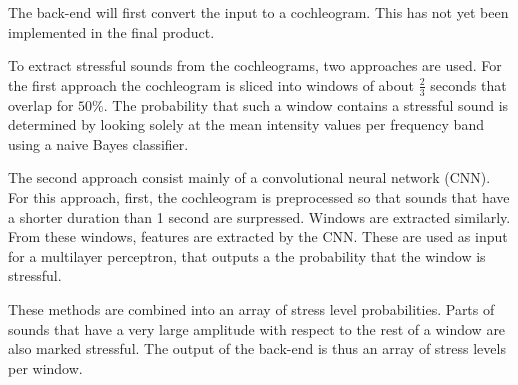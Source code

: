 The back-end will first convert the input to a cochleogram. This has not yet been implemented in the final product.

To extract stressful sounds from the cochleograms, two approaches are used. For the first approach the cochleogram is sliced into windows of about $\frac{2}{3}$ seconds that overlap for $50\%$. The probability that such a window contains a stressful sound is determined by looking solely at the mean intensity values per frequency band using a naive Bayes classifier.  

The second approach consist mainly of a convolutional neural network (CNN). For this approach, first, the cochleogram is preprocessed so that sounds that have a shorter duration than 1 second are surpressed. Windows are extracted similarly. From these windows, features are extracted by the CNN. These are used as input for a multilayer perceptron, that outputs a the probability that the window is stressful. 

These methods are combined into an array of stress level probabilities. Parts of sounds that have a very large amplitude with respect to the rest of a window are also marked stressful. The output of the back-end is thus an array of stress levels per window.



